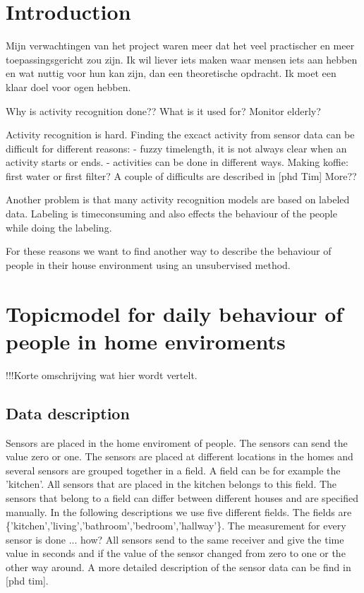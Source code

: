 \documentclass[11pt,a4paper]{report}
\begin{document}
\section{Introduction}
Mijn verwachtingen van het project waren meer dat het veel practischer en meer toepassingsgericht zou zijn. Ik wil liever iets maken waar mensen iets aan hebben en wat nuttig voor hun kan zijn, dan een theoretische opdracht.
Ik moet een klaar doel voor ogen hebben.


Why is activity recognition done?? What is it used for?
Monitor elderly?

Activity recognition is hard. Finding the excact activity from sensor data can be difficult for different reasons:
- fuzzy timelength, it is not always clear when an activity starts or ends.
- activities can be done in different ways. Making koffie: first water or first filter?
A couple of difficults are described in [phd Tim] More??

Another problem is that many activity recognition models are based on labeled data. Labeling is timeconsuming and also effects the behaviour of the people while doing the labeling.

For these reasons we want to find another way to describe the behaviour of people in their house environment using an unsubervised method.


\section{Topicmodel for daily behaviour of people in home enviroments}
!!!Korte omschrijving wat hier wordt vertelt.


\subsection{Data description}
Sensors are placed in the home enviroment of people. The sensors can send the value zero or one. The sensors are placed at different locations in the homes and several sensors are grouped together in a field. A field can be for example the 'kitchen'. All sensors that are placed in the kitchen belongs to this field. The sensors that belong to a field can differ between different houses and are specified manually. In the following descriptions we use five different fields. The fields are \{'kitchen','living','bathroom','bedroom','hallway'\}.
The measurement for every sensor is done ... how? All sensors send to the same receiver and give the time value in seconds and if the value of the sensor changed from zero to one or the other way around.
A more detailed description of the sensor data can be find in [phd tim].
\end{document}
